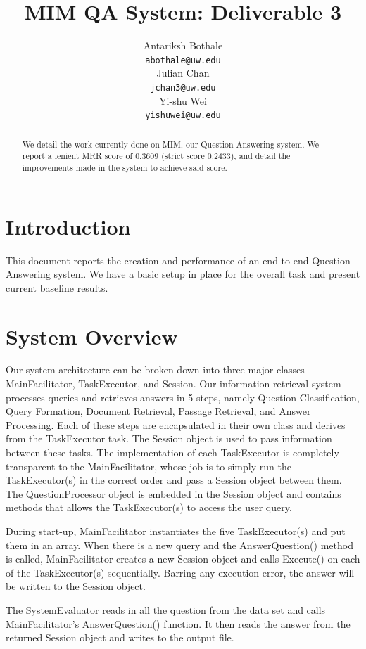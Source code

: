 \documentclass[11pt]{article}
\title{MIM QA System: Deliverable 3}
\author{Antariksh Bothale \\
  {\tt abothale@uw.edu} \\\And
  Julian Chan\\
  {\tt jchan3@uw.edu} \\\And
  Yi-shu Wei\\
  {\tt yishuwei@uw.edu}}
\date{}
\begin{document}
\maketitle
\begin{abstract}
We detail the work currently done on MIM, our Question Answering system. We report a lenient MRR score of 0.3609 (strict score 0.2433), and detail the improvements made in the system to achieve said score.
\end{abstract}

\section{Introduction}
This document reports the creation and performance of an end-to-end Question Answering system. We have a basic setup in place for the overall task and present current baseline results.

\section{System Overview}

Our system architecture can be broken down into three major classes - MainFacilitator, TaskExecutor, and Session. Our information retrieval system processes queries and retrieves answers in 5 steps, namely Question Classification, Query Formation, Document Retrieval, Passage Retrieval, and Answer Processing. Each of these steps are encapsulated in their own class and derives from the TaskExecutor task.  The Session object is used to pass information between these tasks. The implementation of each TaskExecutor is completely transparent to the MainFacilitator, whose job is to simply run the TaskExecutor(s) in the correct order and pass a Session object between them. The QuestionProcessor object is embedded in the Session object and contains methods that allows the TaskExecutor(s) to access the user query.

During start-up, MainFacilitator instantiates the five TaskExecutor(s) and put them in an array. When there is a new query and the AnswerQuestion() method is called, MainFacilitator creates a new Session object and calls Execute() on each of the TaskExecutor(s) sequentially. Barring any execution error, the answer will be written to the Session object.

The SystemEvaluator reads in all the question from the data set and calls MainFacilitator's AnswerQuestion() function. It then reads the answer from the returned Session object and
writes to the output file.
\end{document}
